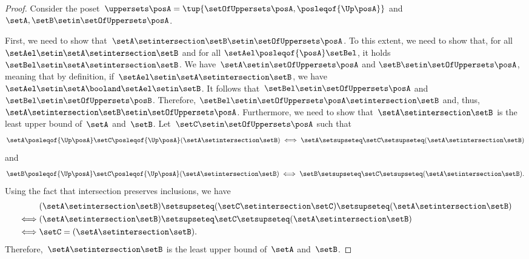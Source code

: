 \begin{proof}
    Consider the poset~$\uppersets \posA=\tup{\setOfUppersets \posA,{{\posleqof{\Up \posA}}}}$ and~$\setA,\setB\setin \setOfUppersets \posA$.

    First, we need to show that~$\setA\setintersection \setB\setin \setOfUppersets \posA$.
    To this extent, we need to show that, for all $\setAel \setin \setA\setintersection \setB$ and for all $\setAel \posleqof{\posA} \setBel$, it holds $\setBel \setin \setA\setintersection \setB$.
    We have~$\setA \setin \setOfUppersets \posA$ and $\setB\setin \setOfUppersets \posA$, meaning that by definition, if~$\setAel\setin \setA\setintersection \setB$, we have~$\setAel \setin \setA \booland \setAel \setin \setB$.
    It follows that~$\setBel \setin \setOfUppersets \posA$ and $\setBel \setin \setOfUppersets \posB$.
    Therefore, $\setBel \setin \setOfUppersets \posA \setintersection \setB$ and, thus, $\setA\setintersection \setB\setin \setOfUppersets \posA$.
    Furthermore, we need to show that~$\setA\setintersection \setB$ is the least upper bound of~$\setA$ and~$\setB$.
    Let~$\setC\setin \setOfUppersets \posA$ such that~
    \[
        \setA\posleqof{\Up \posA} \setC \posleqof{\Up \posA} (\setA\setintersection \setB)
        \iff
        \setA\setsupseteq \setC\setsupseteq (\setA\setintersection \setB)
    \]
    and
    \[
        \setB \posleqof{\Up \posA} \setC \posleqof{\Up \posA} (\setA\setintersection \setB)
        \iff
        \setB\setsupseteq \setC\setsupseteq (\setA\setintersection \setB).
    \]
    Using the fact that intersection preserves inclusions, we have
    \begin{equation*}
        \begin{aligned}
                 & (\setA\setintersection \setB)
            \setsupseteq (\setC\setintersection \setC) \setsupseteq (\setA\setintersection \setB ) \\
            \iff & (\setA\setintersection \setB)  \setsupseteq \setC \setsupseteq (\setA\setintersection \setB ) \\
            \iff & \setC                          = (\setA\setintersection \setB).
        \end{aligned}
    \end{equation*}
    Therefore,~$\setA\setintersection \setB$ is the least upper bound of~$\setA$ and~$\setB$.


\end{proof}
